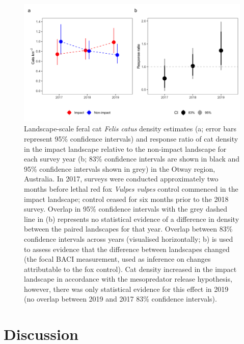 \documentclass[11pt,a4paper,titlepage,twoside,openright]{style/unimelbthesis}
\begin{document}
\begin{mainmatter}
\begin{figure}
{\centering \includegraphics[width=1\linewidth]{figure/otways_estimates_600dpi} 

}

\caption{Landscape-scale feral cat \textit{Felis catus} density estimates (a; error bars represent 95\% confidence intervals) and response ratio of cat density in the impact landscape relative to the non-impact landscape for each survey year (b; 83\% confidence intervals are shown in black and 95\% confidence intervals shown in grey) in the Otway region, Australia. In 2017, surveys were conducted approximately two months before lethal red fox \textit{Vulpes vulpes} control commenced in the impact landscape; control ceased for six months prior to the 2018 survey. Overlap in 95\% confidence intervals with the grey dashed line in (b) represents no statistical evidence of a difference in density between the paired landscapes for that year. Overlap between 83\% confidence intervals across years (visualised horizontally; b) is used to assess evidence that the difference between landscapes changed (the focal BACI measurement, used as inference on changes attributable to the fox control). Cat density increased in the impact landscape in accordance with the mesopredator release hypothesis, however, there was only statistical evidence for this effect in 2019 (no overlap between 2019 and 2017 83\% confidence intervals).}\label{fig:diffo}
\end{figure}
\newpage

\hypertarget{discussion-2}{%
\section{Discussion}\label{discussion-2}}


\end{mainmatter}
\end{document}
